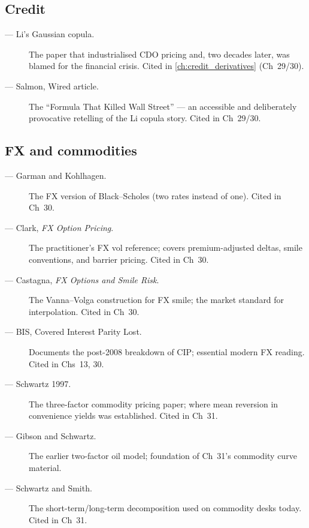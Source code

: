 \subsection{Credit}

\begin{description}
  \item[\citet{li2000default} --- Li's Gaussian copula.] The paper
    that industrialised CDO pricing and, two decades later, was
    blamed for the financial crisis. Cited in \cref{ch:credit_derivatives}
    (Ch~29/30).
  \item[\citet{salmon2009formula} --- Salmon, Wired article.] The
    ``Formula That Killed Wall Street'' --- an accessible and
    deliberately provocative retelling of the Li copula story.
    Cited in Ch~29/30.
\end{description}

\subsection{FX and commodities}

\begin{description}
  \item[\citet{garman1983foreign} --- Garman and Kohlhagen.] The
    FX version of Black--Scholes (two rates instead of one). Cited
    in Ch~30.
  \item[\citet{clark2011foreign} --- Clark, \emph{FX Option Pricing}.]
    The practitioner's FX vol reference; covers premium-adjusted
    deltas, smile conventions, and barrier pricing. Cited in Ch~30.
  \item[\citet{castagna2007consistent} --- Castagna, \emph{FX Options
    and Smile Risk}.] The Vanna--Volga construction for FX smile;
    the market standard for interpolation. Cited in Ch~30.
  \item[\citet{borio2016covered} --- BIS, Covered Interest Parity
    Lost.] Documents the post-2008 breakdown of CIP; essential
    modern FX reading. Cited in Chs~13, 30.
  \item[\citet{schwartz1997stochastic} --- Schwartz 1997.] The
    three-factor commodity pricing paper; where mean reversion in
    convenience yields was established. Cited in Ch~31.
  \item[\citet{gibsonschwartz1990} --- Gibson and Schwartz.] The
    earlier two-factor oil model; foundation of Ch~31's commodity
    curve material.
  \item[\citet{schwartzsmith2000} --- Schwartz and Smith.] The
    short-term/long-term decomposition used on commodity desks
    today. Cited in Ch~31.
\end{description}

